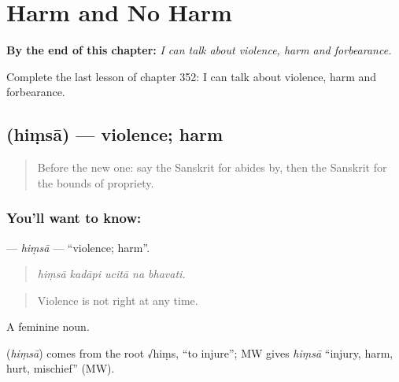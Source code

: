 
\chapter{Harm and No Harm}
\label{ch:sa-harm-and-no-harm}

\begin{chapteropening}
\textbf{By the end of this chapter:} \emph{I can talk about violence, harm and forbearance.}

Complete the last lesson of chapter 352: I can talk about violence, harm and forbearance.
\end{chapteropening}

\section[\texorpdfstring{\sk{हिंसा} (hiṃsā)}{हिंसा (hiṃsā)}]{ (hiṃsā) — violence; harm}

\label{lesson:SA-C352-himsa}



\begin{quote}
Before the new one: say the Sanskrit for abides by, then the Sanskrit for the bounds of propriety.
\end{quote}

\subsection*{You'll want to know: }
\textbf{} — \emph{hiṃsā} — \textquotedblleft{}violence; harm\textquotedblright{}.

\begin{quote}
    
\end{quote}

\begin{quote}
\emph{hiṃsā kadāpi ucitā na bhavati.}
\end{quote}

\begin{quote}
Violence is not right at any time.
\end{quote}

A feminine noun.

\begin{cousinweb}
\textbf{} (\emph{hiṃsā}) comes from the root √hiṃs, \textquotedblleft{}to injure\textquotedblright{}; MW gives \emph{hiṃsā} \textquotedblleft{}injury, harm, hurt, mischief\textquotedblright{} (MW).
\end{cousinweb}

